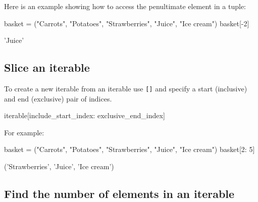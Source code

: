 Here is an example showing how to access the penultimate element in a tuple:




\begin{pyin}
basket = ("Carrots", "Potatoes", "Strawberries", "Juice", "Ice cream")
basket[-2]
\end{pyin}





\begin{raw}
'Juice'
\end{raw}





\subsection{Slice an iterable}
\label{\detokenize{building-tools/02-functions-and-data-structures/how/main:slice-an-iterable}}\label{\detokenize{building-tools/02-functions-and-data-structures/how/main:id2}}

To create a new iterable from an iterable use \texttt{[]} and specify a start
(inclusive) and end (exclusive) pair of indices.


\begin{pyin}
iterable[include_start_index: exclusive_end_index]
\end{pyin}



For example:




\begin{pyin}
basket = ("Carrots", "Potatoes", "Strawberries", "Juice", "Ice cream")
basket[2: 5]
\end{pyin}





\begin{raw}
('Strawberries', 'Juice', 'Ice cream')
\end{raw}





\subsection{Find the number of elements in an iterable}
\label{\detokenize{building-tools/02-functions-and-data-structures/how/main:find-the-number-of-elements-in-an-iterable}}\label{\detokenize{building-tools/02-functions-and-data-structures/how/main:id3}}

